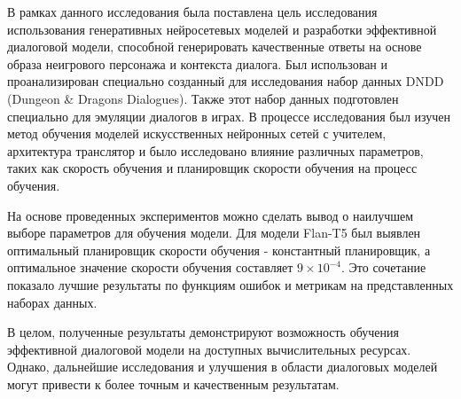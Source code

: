 В рамках данного исследования была поставлена цель исследования использования генеративных нейросетевых моделей и разработки эффективной диалоговой модели, способной генерировать качественные ответы на основе образа неигрового персонажа и контекста диалога. Был использован и проанализирован специально созданный для исследования набор данных DNDD (Dungeon \& Dragons Dialogues). Также этот набор данных подготовлен специально для эмуляции диалогов в играх. В процессе исследования был изучен метод обучения моделей искусственных нейронных сетей с учителем, архитектура транслятор и было исследовано влияние различных параметров, таких как скорость обучения и планировщик скорости обучения на процесс обучения.

На основе проведенных экспериментов можно сделать вывод о наилучшем выборе параметров для обучения модели. Для модели Flan-T5 был выявлен оптимальный планировщик скорости обучения - константный планировщик, а оптимальное значение скорости обучения составляет $9 \times 10^{-4}$. Это сочетание показало лучшие результаты по функциям ошибок и метрикам на представленных наборах данных.

В целом, полученные результаты демонстрируют возможность обучения эффективной диалоговой модели на доступных вычислительных ресурсах. Однако, дальнейшие исследования и улучшения в области диалоговых моделей могут привести к более точным и качественным результатам.